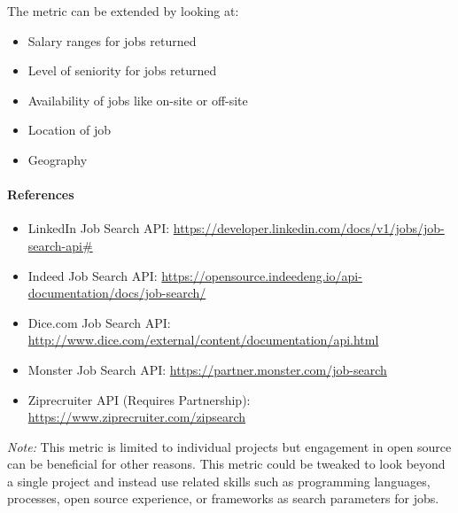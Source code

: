 The metric can be extended by looking at:

\begin{itemize}
\tightlist
\item
  Salary ranges for jobs returned
\item
  Level of seniority for jobs returned
\item
  Availability of jobs like on-site or off-site
\item
  Location of job
\item
  Geography
\end{itemize}

\hypertarget{references}{%
\paragraph{References}\label{references}}

\begin{itemize}
\tightlist
\item
  LinkedIn Job Search API:
  \href{https://developer.linkedin.com/docs/v1/jobs/job-search-api\#}{https://developer.linkedin.com/docs/v1/jobs/job-search-api\#}
\item
  Indeed Job Search API:
  \href{https://opensource.indeedeng.io/api-documentation/docs/job-search/}{https://opensource.indeedeng.io/api-documentation/docs/job-search/}
\item
  Dice.com Job Search API:
  \href{http://www.dice.com/external/content/documentation/api.html}{http://www.dice.com/external/content/documentation/api.html}
\item
  Monster Job Search API:
  \href{https://partner.monster.com/job-search}{https://partner.monster.com/job-search}
\item
  Ziprecruiter API (Requires Partnership):
  \href{https://www.ziprecruiter.com/zipsearch}{https://www.ziprecruiter.com/zipsearch}
\end{itemize}

\emph{Note:} This metric is limited to individual projects but
engagement in open source can be beneficial for other reasons. This
metric could be tweaked to look beyond a single project and instead use
related skills such as programming languages, processes, open source
experience, or frameworks as search parameters for jobs.
